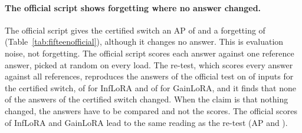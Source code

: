 \paragraph{The official script shows forgetting where no answer changed.} The official script gives
the certified switch an AP of \FifteenCertOffAP{} and a forgetting of \FifteenCertOffFT{}
(Table~\ref{tab:fifteenofficial}), although it changes no answer. This is evaluation noise, not
forgetting. The official script scores each answer against one reference answer, picked at random
on every load. The re-test, which scores every answer against all references, reproduces the
answers of the official test on \FifteenCertSame{} of \FifteenCertSameOf{} inputs for the certified
switch, \FifteenInfSame{} of \FifteenInfSameOf{} for InfLoRA and \FifteenGainSame{} of
\FifteenGainSameOf{} for GainLoRA, and it finds that none of the \FifteenCertCompared{} answers of
the certified switch changed. When the claim is that nothing changed, the answers have to be
compared and not the scores. The official scores of InfLoRA and GainLoRA lead to the same reading as
the re-test (AP \FifteenInfOffAP{} and \FifteenGainOffAP{}).

\begin{table}[t]
  \caption{Fifteen-task sequence with the original and with reworded instructions. The five tasks
  that have rewordings are those of the five-task sequence; they sit inside the 15-task sequence.
  AP is the average score of these five tasks after the last task, and ``Answers changed'' counts
  the test inputs of the first four of them (of 400); in the column ``original'' it counts those of the first 14 tasks (of 1{,}097). The adapters are those of Table~\ref{tab:fifteenmain};
  nothing is retrained. The column ``original'' is the whole sequence of 15 tasks.}
  \label{tab:fifteenwordings}
  \centering
  \small
  \setlength{\tabcolsep}{3.5pt}
  
\end{table}

